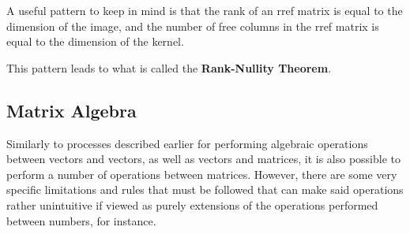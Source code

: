 \documentclass[12pt]{article}
\begin{document}
A useful pattern to keep in mind is that the rank of an rref matrix is equal to the dimension of the image, and the number of free columns in the rref matrix is equal to the dimension of the kernel.

This pattern leads to what is called the \textbf{Rank-Nullity Theorem}.

\subsection{Matrix Algebra}

Similarly to processes described earlier for performing algebraic operations between vectors and vectors, as well as vectors and matrices, it is also possible to perform a number of operations between matrices. However, there are some very specific limitations and rules that must be followed that can make said operations rather unintuitive if viewed as purely extensions of the operations performed between numbers, for instance.
\end{document}
